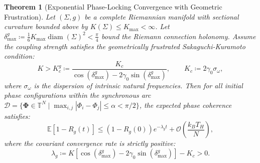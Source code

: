\documentclass[11pt,a4paper,reqno]{article}
\theoremstyle{plain}
\newtheorem{theorem}{Theorem}[section]
\theoremstyle{definition}
\theoremstyle{remark}
\numberwithin{equation}{section}
\begin{document}
\begin{theorem}[Exponential Phase-Locking Convergence with Geometric Frustration]
\label{thm:curved_kuramoto}
Let $(\Sigma, g)$ be a complete Riemannian manifold with sectional curvature bounded above by $K(\Sigma) \le K_{\max} < \infty$. Let $\delta_{\max}^g \coloneqq \frac{1}{6} K_{\max} \operatorname{diam}(\Sigma)^2 < \frac{\pi}{4}$ bound the Riemann connection holonomy. Assume the coupling strength satisfies the geometrically frustrated Sakaguchi-Kuramoto condition:
\begin{equation}
K > K_c^g \coloneqq \frac{K_c}{\cos(\delta_{\max}^g) - 2 \gamma_0 \sin(\delta_{\max}^g)}, \qquad K_c \coloneqq 2 \gamma_0 \sigma_\omega,
\end{equation}
where $\sigma_\omega$ is the dispersion of intrinsic natural frequencies. Then for all initial phase configurations within the synchronous arc $\mathcal{D} = \{ \bm{\Phi} \in \mathbb{T}^N \mid \max_{i, j} |\Phi_i - \Phi_j| \le \alpha < \pi/2 \}$, the expected phase coherence satisfies:
\begin{equation}
\mathbb{E}\left[ 1 - R_g(t) \right] \le \left(1 - R_g(0)\right) e^{-\lambda_g t} + \mathcal{O}\left( \frac{k_B T_H}{N} \right),
\label{eq:exp_decay_bound}
\end{equation}
where the covariant convergence rate is strictly positive:
\begin{equation}
\lambda_g \coloneqq K \left[ \cos(\delta_{\max}^g) - 2 \gamma_0 \sin(\delta_{\max}^g) \right] - K_c > 0.
\label{eq:true_lambda_g}
\end{equation}
\end{theorem}
\end{document}
